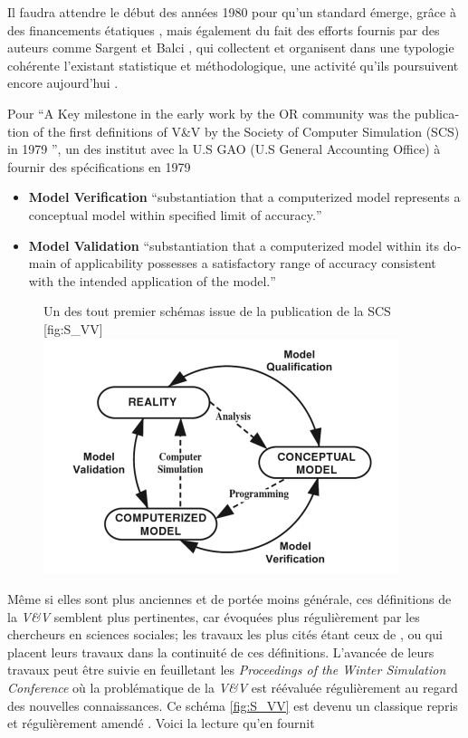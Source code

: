 Il faudra attendre le début des années 1980 pour qu'un standard émerge, grâce à des financements étatiques \autocite{Balci1986}, mais également du fait des efforts fournis par des auteurs comme Sargent et Balci \autocite{Nance2002}, qui collectent et organisent dans une typologie cohérente l'existant statistique et méthodologique, une activité qu'ils poursuivent encore aujourd'hui \autocite{Balci1998}.

Pour \autocite[22]{Oberkampf2010} \foreignquote{english}{A Key milestone in the early work by the OR community was the publication of the first definitions of V\&V by the Society of Computer Simulation (SCS) in 1979 \autocite{Schlesinger1979}}, un des institut avec la U.S GAO (U.S General Accounting Office) à fournir des spécifications en 1979 \autocite{Balci1986} 

\begin{itemize}
\item \textbf{Model Verification} \foreignquote{english}{substantiation that a computerized model represents a conceptual model within specified limit of accuracy.}
\item \textbf{Model Validation} \foreignquote{english}{substantiation that a computerized model within its domain of applicability possesses a satisfactory range of accuracy consistent with the intended application of the model.}
\end{itemize}

\begin{figure}[h]
\begin{sidecaption}[fortoc]{Un des tout premier schémas issue de la publication de la SCS \autocite{Oberkampf2010,Schlesinger1979}}[fig:S_VV]
  \centering
 \includegraphics[width=.7\linewidth]{schelinger_schema1979.png}
  \end{sidecaption}
\end{figure}

Même si elles sont plus anciennes et de portée moins générale, ces définitions de la \textit{V\&V} semblent plus pertinentes, car évoquées plus régulièrement par les chercheurs en sciences sociales; les travaux les plus cités étant ceux de \textcite{Kleijnen1995}, ou \textcite{Sargent2010} qui placent leurs travaux dans la continuité de ces définitions. L'avancée de leurs travaux peut être suivie en feuilletant les \textit{Proceedings of the Winter Simulation Conference} où la problématique de la \textit{V\&V} est réévaluée régulièrement au regard des nouvelles connaissances. Ce schéma \ref{fig:S_VV} est devenu un classique repris et régulièrement amendé \autocite{Sargent2010}. Voici la lecture qu'en fournit \autocite{Oberkampf2010} 

